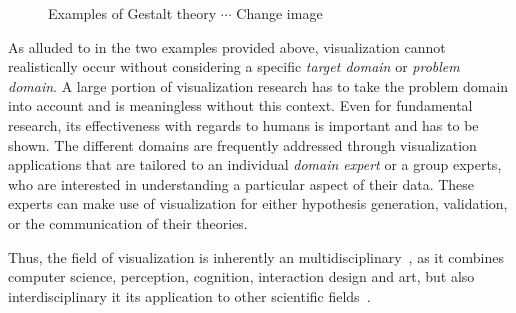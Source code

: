 \begin{figure}
  \centering
  \caption{Examples of Gestalt theory $\cdots$ Change image}
  \label{fig:motivation:gestalt}
\end{figure}

As alluded to in the two examples provided above, visualization cannot realistically occur without considering a specific \emph{target domain} or \emph{problem domain}.  A large portion of visualization research has to take the problem domain into account and is meaningless without this context.  Even for fundamental research, its effectiveness with regards to humans is important and has to be shown.  The different domains are frequently addressed through visualization applications that are tailored to an individual \emph{domain expert} or a group experts, who are interested in understanding a particular aspect of their data.  These experts can make use of visualization for either hypothesis generation, validation, or the communication of their theories.

Thus, the field of visualization is inherently an multidisciplinary~\cite{defanti1989visualization}, as it combines computer science, perception, cognition, interaction design and art, but also interdisciplinary it its application to other scientific fields~\cite{kirby2013visualization}.


